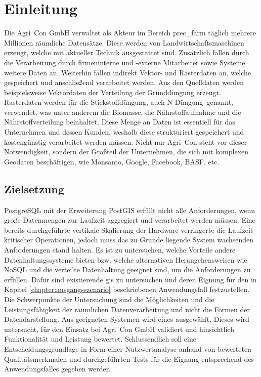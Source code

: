 \chapter{Einleitung}
Die Agri~Con GmbH verwaltet als Akteur im Bereich \Gls{prec_farm} täglich mehrere Millionen räumliche Datensätze.
Diese werden von Landwirtschaftsmaschinen erzeugt, welche mit aktueller Technik ausgestattet sind.
Zusätzlich fallen durch die Verarbeitung durch firmeninterne und -externe Mitarbeiter sowie Systeme weitere Daten an.
Weiterhin fallen indirekt Vektor- und Rasterdaten an, welche gespeichert und anschließend verarbeitet werden.
Aus den Quelldaten werden beispielsweise Vektordaten der Verteilung der Grunddüngung erzeugt.
Rasterdaten werden für die Stickstoffdüngung, auch \glqq N-Düngung\grqq\ genannt, verwendet, was unter anderem die Biomasse, die Nährstoffaufnahme und die Nährstoffverteilung beinhaltet.
Diese Menge an Daten ist essentiell für das Unternehmen und dessen Kunden, weshalb diese strukturiert gespeichert und kostengünstig verarbeitet werden müssen.
Nicht nur Agri~Con steht vor dieser Notwendigkeit, sondern der Großteil der Unternehmen, die sich mit komplexen Geodaten beschäftigen, wie Monsanto, Google, Facebook, BASF, etc.


\section{Zielsetzung}
PostgreSQL mit der Erweiterung PostGIS erfüllt nicht alle Anforderungen, wenn große Datenmengen zur Laufzeit aggregiert und verarbeitet werden müssen. %
Eine bereits durchgeführte vertikale Skalierung der Hardware verringerte die Laufzeit kritischer Operationen, jedoch muss das zu Grunde liegende System wachsenden Anforderungen stand halten.
Es ist zu untersuchen, welche Vorteile andere Datenhaltungssysteme bieten bzw. welche alternativen Herangehensweisen wie NoSQL und die verteilte Datenhaltung geeignet sind, um die Anforderungen zu erfüllen. %
Dafür sind existierende \Gls{gis} zu untersuchen und deren Eignung für den in Kapitel \ref{chapter:ausgangsszenario} beschriebenen Anwendungsfall festzustellen.
Die Schwerpunkte der Untersuchung sind die Möglichkeiten und die Leistungsfähigkeit der räumlichen Datenverarbeitung und nicht die Formen der Datendarstellung.
Aus geeigneten Systemen wird eines ausgewählt.
Dieses wird untersucht, für den Einsatz bei Agri~Con GmbH validiert und hinsichtlich Funktionalität und Leistung bewertet.
Schlussendlich soll eine Entscheidungsgrundlage in Form einer Nutzwertanalyse anhand von bewerteten Qualitätsmerkmalen und durchgeführten Tests für die Eignung entsprechend des Anwendungsfalles gegeben werden.

